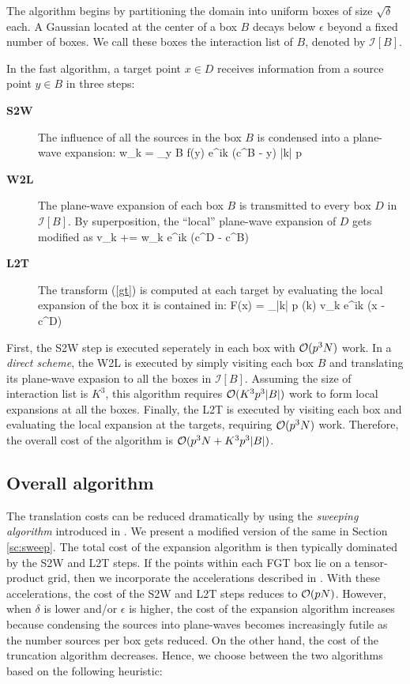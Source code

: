 The algorithm begins by partitioning the domain into uniform boxes of size $\sqrt{\delta}$ each. A Gaussian located at the center of a box $B$ decays below $\epsilon$ beyond a fixed number of boxes. We call these boxes the interaction list of $B$, denoted by $\mathcal{I}[B]$. 

In the fast algorithm, a target point $x \in D$ receives information from a source point $y \in B$ in three steps:
\begin{description}
\item[\textbf{S2W}] The influence of all the sources in the box $B$ is condensed into a plane-wave expansion:
            \beq w_k = \sum_{y \in B} f(y) e^{i\lambda k \cdot (c^B - y)} \quad \forall\quad |k| \leq p  \label{eqn:s2w} \eeq
            
\item[\textbf{W2L}] The plane-wave expansion of each box $B$ is transmitted to every box $D$ in $\mathcal{I}[B]$. By
 superposition, the ``local'' plane-wave expansion of $D$ gets modified as
            \beq v_k += w_k e^{i\lambda k \cdot (c^D - c^B)} \label{e:w2l}\eeq
            
\item[\textbf{L2T}] The transform (\ref{gt}) is computed at each target by evaluating the local expansion of the 
box it is contained in:
            \beq F(x) = \sum_{|k| \leq p} (k) v_k e^{i\lambda k \cdot (x - c^D)} \label{eqn:l2t}\eeq
\end{description} 

First, the S2W step is executed seperately in each box with $\mathcal{O}(p^3 N)$ work. In a {\em direct scheme}, 
the W2L is executed by simply visiting each box $B$ and translating its plane-wave expasion to all the boxes
 in $\mathcal{I}[B]$. Assuming the size of interaction list is $K^3$, this algorithm requires $\mathcal{O}(K^3 p^3 |B|)$ work 
 to form local expansions at all the boxes. Finally, the L2T is executed by visiting each box and evaluating the 
 local expansion at the targets, requiring $\mathcal{O}(p^3 N)$ work. Therefore, the overall cost of the algorithm is $\mathcal{O}(p^3 N + K^3 p^3 |B|)$.  

\subsection{Overall algorithm} 
The translation costs can be reduced dramatically by using the {\em sweeping algorithm} introduced in \cite{greengard98}. We present a 
modified version of the same in Section \ref{sc:sweep}. The total cost of the expansion algorithm is then typically dominated by the S2W
 and L2T steps. If the points within each FGT box lie on a tensor-product grid, then we 
 incorporate the accelerations described in \cite{fggt}. With these accelerations, the cost of the S2W and
 L2T steps reduces to $\mathcal{O}(p N)$. However, when $\delta$ is lower and/or $\epsilon$ is higher, the cost of
 the expansion algorithm increases because condensing the sources into plane-waves becomes increasingly futile as
 the number sources per box gets reduced. On the other hand, the
 cost of the truncation algorithm decreases. Hence, we choose between the two algorithms based on the following heuristic:


